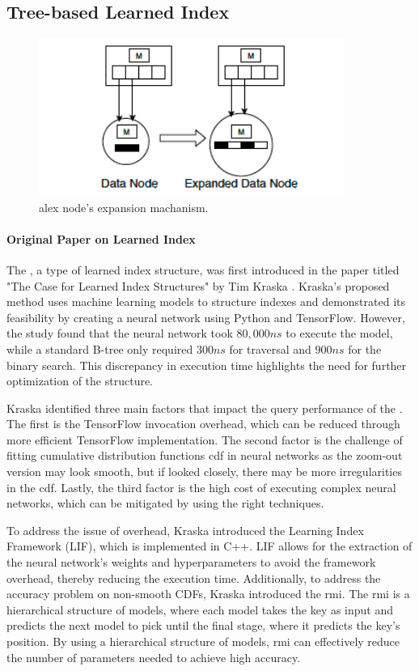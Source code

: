 \subsection{Tree-based Learned Index}
\begin{figure}
    \centering
    \includegraphics[width=100mm,scale=1]{Figures/alexNodeExpand.png}
    \caption{
     \acrlong{alex} node's expansion machanism.
    }
    \label{fig:alexNodeExpand}
\end{figure}
\paragraph{Original Paper on Learned Index}
The \learnindex, a type of learned index structure, was first introduced in the paper titled "The Case for Learned Index Structures" by Tim Kraska \cite{CasedLearnedIndex}. Kraska's proposed method uses machine learning models to structure indexes and demonstrated its feasibility by creating a neural network using Python and TensorFlow. However, the study found that the neural network took $80,000ns$ to execute the model, while a standard B-tree only required $300ns$ for traversal and $900ns$ for the binary search. This discrepancy in execution time highlights the need for further optimization of the \learnindex structure.

Kraska identified three main factors that impact the query performance of the \learnindex. The first is the TensorFlow invocation overhead, which can be reduced through more efficient TensorFlow implementation. The second factor is the challenge of fitting cumulative distribution functions \acrfull{cdf} in neural networks as the \textsf{zoom-out} version may look smooth, but if looked closely, there may be more irregularities in the \acrshort{cdf}. Lastly, the third factor is the high cost of executing complex neural networks, which can be mitigated by using the right techniques.

To address the issue of overhead, Kraska introduced the Learning Index Framework (LIF), which is implemented in C++. LIF allows for the extraction of the neural network's weights and hyperparameters to avoid the framework overhead, thereby reducing the execution time. Additionally, to address the accuracy problem on non-smooth CDFs, Kraska introduced the \acrfull{rmi}. The \acrshort{rmi} is a hierarchical structure of models, where each model takes the key as input and predicts the next model to pick until the final stage, where it predicts the key's position. By using a hierarchical structure of models, \acrshort{rmi} can effectively reduce the number of parameters needed to achieve high accuracy.

